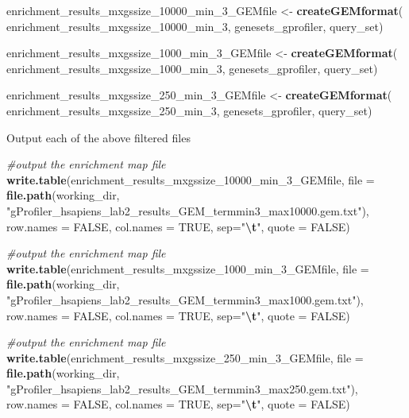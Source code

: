 \documentclass[
]{book}
\newenvironment{Shaded}{\begin{snugshade}}{\end{snugshade}}
\newcommand{\AttributeTok}[1]{\textcolor[rgb]{0.13,0.29,0.53}{#1}}
\newcommand{\CommentTok}[1]{\textcolor[rgb]{0.56,0.35,0.01}{\textit{#1}}}
\newcommand{\ConstantTok}[1]{\textcolor[rgb]{0.56,0.35,0.01}{#1}}
\newcommand{\FunctionTok}[1]{\textcolor[rgb]{0.13,0.29,0.53}{\textbf{#1}}}
\newcommand{\NormalTok}[1]{#1}
\newcommand{\OtherTok}[1]{\textcolor[rgb]{0.56,0.35,0.01}{#1}}
\newcommand{\SpecialCharTok}[1]{\textcolor[rgb]{0.81,0.36,0.00}{\textbf{#1}}}
\newcommand{\StringTok}[1]{\textcolor[rgb]{0.31,0.60,0.02}{#1}}
\begin{document}
\begin{Shaded}
\begin{Highlighting}[]
\NormalTok{enrichment\_results\_mxgssize\_10000\_min\_3\_GEMfile }\OtherTok{\textless{}{-}} \FunctionTok{createGEMformat}\NormalTok{(}
\NormalTok{  enrichment\_results\_mxgssize\_10000\_min\_3, genesets\_gprofiler, query\_set)}

\NormalTok{enrichment\_results\_mxgssize\_1000\_min\_3\_GEMfile }\OtherTok{\textless{}{-}} \FunctionTok{createGEMformat}\NormalTok{(}
\NormalTok{  enrichment\_results\_mxgssize\_1000\_min\_3, genesets\_gprofiler, query\_set)}

\NormalTok{enrichment\_results\_mxgssize\_250\_min\_3\_GEMfile }\OtherTok{\textless{}{-}} \FunctionTok{createGEMformat}\NormalTok{(}
\NormalTok{  enrichment\_results\_mxgssize\_250\_min\_3, genesets\_gprofiler, query\_set)}
\end{Highlighting}
\end{Shaded}

Output each of the above filtered files

\begin{Shaded}
\begin{Highlighting}[]
\CommentTok{\#output the enrichment map file}
\FunctionTok{write.table}\NormalTok{(enrichment\_results\_mxgssize\_10000\_min\_3\_GEMfile, }
            \AttributeTok{file =} \FunctionTok{file.path}\NormalTok{(working\_dir, }
                \StringTok{"gProfiler\_hsapiens\_lab2\_results\_GEM\_termmin3\_max10000.gem.txt"}\NormalTok{),}
            \AttributeTok{row.names =} \ConstantTok{FALSE}\NormalTok{, }
            \AttributeTok{col.names =} \ConstantTok{TRUE}\NormalTok{, }\AttributeTok{sep=}\StringTok{"}\SpecialCharTok{\textbackslash{}t}\StringTok{"}\NormalTok{,}
            \AttributeTok{quote =} \ConstantTok{FALSE}\NormalTok{)}

\CommentTok{\#output the enrichment map file}
\FunctionTok{write.table}\NormalTok{(enrichment\_results\_mxgssize\_1000\_min\_3\_GEMfile, }
            \AttributeTok{file =} \FunctionTok{file.path}\NormalTok{(working\_dir, }
                \StringTok{"gProfiler\_hsapiens\_lab2\_results\_GEM\_termmin3\_max1000.gem.txt"}\NormalTok{),}
            \AttributeTok{row.names =} \ConstantTok{FALSE}\NormalTok{, }
            \AttributeTok{col.names =} \ConstantTok{TRUE}\NormalTok{, }\AttributeTok{sep=}\StringTok{"}\SpecialCharTok{\textbackslash{}t}\StringTok{"}\NormalTok{,}
            \AttributeTok{quote =} \ConstantTok{FALSE}\NormalTok{)}

\CommentTok{\#output the enrichment map file}
\FunctionTok{write.table}\NormalTok{(enrichment\_results\_mxgssize\_250\_min\_3\_GEMfile, }
            \AttributeTok{file =} \FunctionTok{file.path}\NormalTok{(working\_dir, }
                \StringTok{"gProfiler\_hsapiens\_lab2\_results\_GEM\_termmin3\_max250.gem.txt"}\NormalTok{),}
            \AttributeTok{row.names =} \ConstantTok{FALSE}\NormalTok{, }
            \AttributeTok{col.names =} \ConstantTok{TRUE}\NormalTok{, }\AttributeTok{sep=}\StringTok{"}\SpecialCharTok{\textbackslash{}t}\StringTok{"}\NormalTok{,}
            \AttributeTok{quote =} \ConstantTok{FALSE}\NormalTok{)}
\end{Highlighting}
\end{Shaded}
\end{document}
